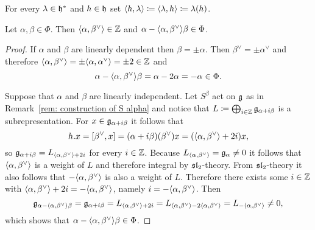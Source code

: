 \begin{defi}
 For every $\lambda \in \mathfrak{h}^*$ and $h \in \mathfrak{h}$ set $\langle h, \lambda\rangle \coloneqq \langle\lambda, h\rangle \coloneqq \lambda(h)$.
\end{defi}


\begin{prop}\label{prop: integral and reflection properties of root pairing}
 Let $\alpha, \beta \in \Phi$. Then $\langle\alpha, \beta^\vee\rangle \in \mathbb{Z}$ and $\alpha - \langle\alpha, \beta^\vee\rangle \beta \in \Phi$.
\end{prop}
\begin{proof}
 If $\alpha$ and $\beta$ are linearly dependent then $\beta = \pm \alpha$. Then $\beta^\vee = \pm \alpha^\vee$ and therefore $\langle\alpha, \beta^\vee\rangle = \pm \langle\alpha, \alpha^\vee\rangle = \pm 2 \in \mathbb{Z}$ and
 \[
 \alpha - \langle\alpha, \beta^\vee\rangle \beta
 = \alpha - 2 \alpha
 = -\alpha \in \Phi.
 \]
 
 Suppose that $\alpha$ and $\beta$ are linearly independent. Let $S^\beta$ act on $\mathfrak{g}$ as in Remark~\ref{rem: construction of S alpha} and notice that $L \coloneqq \bigoplus_{i \in \mathbb{Z}} \mathfrak{g}_{\alpha+i\beta}$ is a subrepresentation. For $x \in \mathfrak{g}_{\alpha+i\beta}$ it follows that
 \[
  h.x = [\beta^\vee, x] = (\alpha+i\beta)(\beta^\vee)x = (\langle\alpha, \beta^\vee\rangle+2i)x,
 \]
 so $\mathfrak{g}_{\alpha+i\beta} = L_{\langle\alpha, \beta^\vee\rangle+2i}$ for every $i \in \mathbb{Z}$. Because $L_{\langle\alpha, \beta^\vee\rangle} = \mathfrak{g}_\alpha \neq 0$ it follows that $\langle\alpha, \beta^\vee\rangle$ is a weight of $L$ and therefore integral by $\mathfrak{sl}_2$-theory. From $\mathfrak{sl}_2$-theory it also follows that $-\langle\alpha, \beta^\vee\rangle$ is also a weight of $L$. Therefore there exists some $i \in \mathbb{Z}$ with $\langle\alpha, \beta^\vee\rangle + 2i = -\langle\alpha, \beta^\vee\rangle$, namely $i = -\langle\alpha, \beta^\vee\rangle$. Then
 \[
  \mathfrak{g}_{\alpha - \langle\alpha, \beta^\vee\rangle \beta}
  = \mathfrak{g}_{\alpha + i\beta}
  = L_{\langle\alpha, \beta^\vee\rangle+2i}
  = L_{\langle\alpha, \beta^\vee\rangle -2\langle\alpha, \beta^\vee\rangle}
  = L_{-\langle\alpha, \beta^\vee\rangle}
  \neq 0,
 \]
 which shows that $\alpha - \langle\alpha, \beta^\vee\rangle \beta \in \Phi$.
\end{proof}



